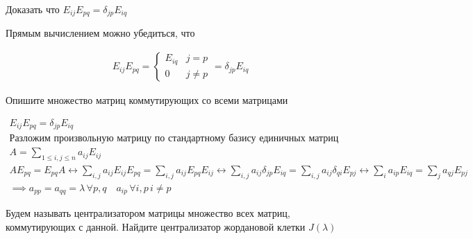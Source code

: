 \begin{prb}
Доказать что $E_{ij}E_{pq} =  \delta_{jp} E_{iq}$
\end{prb}

\begin{sol}
Прямым вычислением можно убедиться, что 

   \begin{align*}
        E_{ij}E_{pq}=\left\{
        \begin{array}{ll}
        E_{iq} & j = p\\
        0 & j\neq p
        \end{array}\right.
        = \delta_{jp}E_{iq}
    \end{align*} 
   
\end{sol}

\begin{prb}
Опишите множество матриц коммутирующих со всеми матрицами
\end{prb}

\begin{sol}
\begin{gather*}
    E_{ij}E_{pq} =  \delta_{jp} E_{iq}\\
    \mbox{Разложим произвольную матрицу по стандартному базису единичных матриц}\\
    A = \sum_{1 \leq i,j \leq n} a_{ij} E_{ij}\\
    A E_{pq} = E_{pq} A  \leftrightarrow \sum_{i,j} a_{ij} E_{ij}E_{pq} = \sum_{i,j} a_{ij} E_{pq} E_{ij} 
    \leftrightarrow  \sum_{i,j} a_{ij} \delta_{jp} E_{iq} = \sum_{i,j} a_{ij} \delta_{qi} E_{pj} \leftrightarrow \sum_{i} a_{ip} E_{iq} = \sum_{j} a_{qj} E_{pj} \\
    \implies
    a_{pp} = a_{qq}  = \lambda \, \forall p,q \quad
    a_{ip} \, \forall i,p \, i\neq p
\end{gather*}
\end{sol}


\begin{prb}
Будем называть централизатором матрицы множество всех матриц, коммутирующих с данной. Найдите централизатор жордановой клетки $J(\lambda)$
\end{prb}

